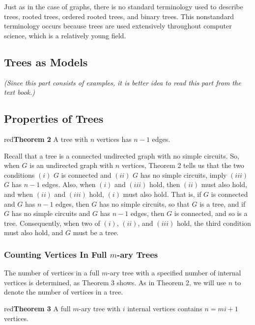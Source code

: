 \documentclass{article}
\begin{document}
Just as in the case of graphs, there is no standard terminology used to describe trees, rooted trees, ordered rooted trees, and binary trees. This nonstandard terminology occurs because trees are used extensively throughout computer science, which is a relatively young field.

\subsection{Trees as Models}

\textit{(Since this part consists of examples, it is better idea to read this part from the text book.)}

\subsection{Properties of Trees}

\begin{mybox}{red}{\textbf{Theorem 2}}
A tree with $n$ vertices has $n - 1$ edges.
\end{mybox}

Recall that a tree is a connected undirected graph with no simple circuits. So, when $G$ is an undirected graph with $n$ vertices, Theorem 2 tells us that the two conditions $(i)$ $G$ is connected and $(ii)$ $G$ has no simple circuits, imply $(iii)$ $G$ has $n - 1$ edges. Also, when $(i)$ and $(iii)$ hold, then $(ii)$ must also hold, and when $(ii)$ and $(iii)$ hold, $(i)$ must also hold. That is, if $G$ is connected and $G$ has $n - 1$ edges, then $G$ has no simple circuits, so that $G$ is a tree, and if $G$ has no simple circuits and $G$ has $n - 1$ edges, then $G$ is connected, and so is a tree. Consequently, when two of $(i)$, $(ii)$, and $(iii)$ hold, the third condition must also hold, and $G$ must be a tree.

\subsubsection{Counting Vertices In Full $m$-ary Trees}

The number of vertices in a full $m$-ary tree with a specified number of internal vertices is determined, as Theorem 3 shows. As in Theorem 2, we will use $n$ to denote the number of vertices in a tree.

\begin{mybox}{red}{\textbf{Theorem 3}}
A full $m$-ary tree with $i$ internal vertices contains $n = mi + 1$ vertices.
\end{mybox}
\end{document}
